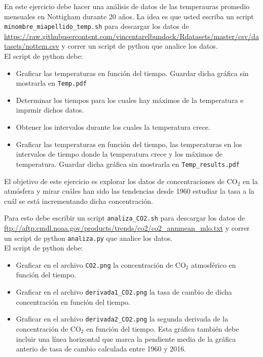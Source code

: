 \documentclass[11pt,letterpaper]{exam}
\begin{document}
\begin{questions}



En este ejercicio debe hacer una análisis de datos de las temperauras promedio mensuales en Nottigham durante 20 años. La idea es que usted escriba un script \verb"minombre_miapellido_temp.sh" para descargar los datos de \url{https://raw.githubusercontent.com/vincentarelbundock/Rdatasets/master/csv/datasets/nottem.csv} y correr un script de python que analice los datos.\\

El script de python debe: 

\begin{itemize}
\item Graficar las temperaturas en función del tiempo. Guardar dicha gráfica sin mostrarla en \verb"Temp.pdf"
\item Determinar los tiempos para los cuales hay máximos de la temperatura e imprmir dichos datos. 
\item Obtener los intervalos durante los cuales la temperatura crece.
\item Graficar las temperaturas en función del tiempo, las temperaturas en los intervalos de tiempo donde la temperatura crece y los máximos de temperatura. Guardar dicha gráfica sin mostrarla en \verb"Temp_results.pdf" 
\end{itemize}


El objetivo de este ejercicio es explorar los datos de concentraciones
de CO$_2$ en la atmósfera y mirar cuáles han sido las tendencias desde
1960 estudiar la tasa a la cuál se está incrementando dicha
concentración. 


Para esto debe escribir un script \verb"analiza_CO2.sh" para descargar los datos de
\url{ftp://aftp.cmdl.noaa.gov/products/trends/co2/co2_annmean_mlo.txt}
y correr un script de python \verb"analiza.py" que analice los datos.\\

El script de python debe: 

\begin{itemize}
\item Graficar en el archivo \verb"CO2.png" la concentración de CO$_2$
  atmosférico en función del tiempo.
\item Graficar en el archivo \verb"derivada1_CO2.png" la tasa de
  cambio de dicha concentración en función del tiempo. 
\item Graficar en el archivo \verb"derivada2_CO2.png" la segunda
  derivada de la concentraci\'on de CO$_2$ en funci\'on del tiempo.
  Esta gr\'afica tambi\'en debe incluir una l\'inea horizontal que
  marca la pendiente media de la gr\'afica anterio de tasa de cambio
  calculada entre 1960 y 2016.
\end{itemize}


\end{questions}
\end{document}
